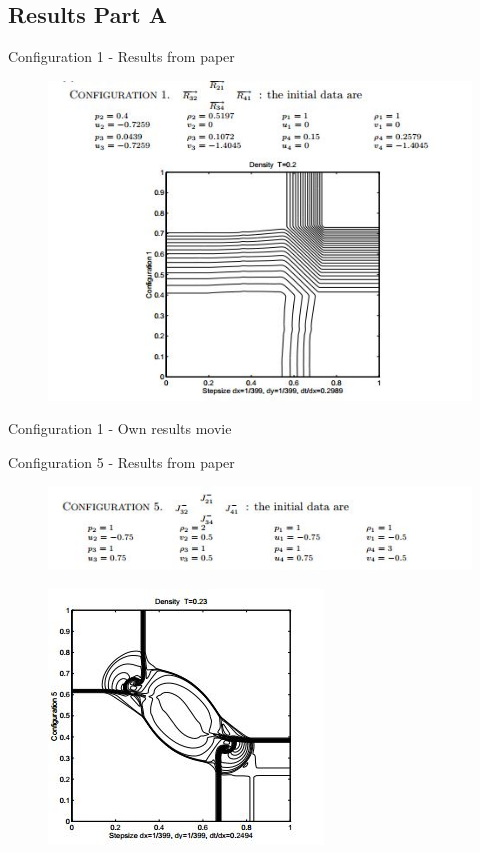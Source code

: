 \subsection{Results Part A}


\begin{frame}{Configuration 1 - Results from paper}	
\begin{figure}
\centering
\includegraphics[width=0.8\linewidth]{../../figs/configuration1_paper}
\label{fig:configuration1_paper}
\end{figure}
\end{frame}

\begin{frame}{Configuration 1 - Own results}
	movie
\end{frame}

\begin{frame}{Configuration 5 - Results from paper}	
	
\begin{figure}
\centering
\includegraphics[width=0.6\linewidth]{../../figs/configuration5_paper_1}
\label{fig:configuration5_paper_1}
\end{figure}

\begin{figure}
\centering
\includegraphics[width=0.5\linewidth]{../../figs/configuration5_paper_2}
\label{fig:configuration5_paper_2}
\end{figure}

\end{frame}

